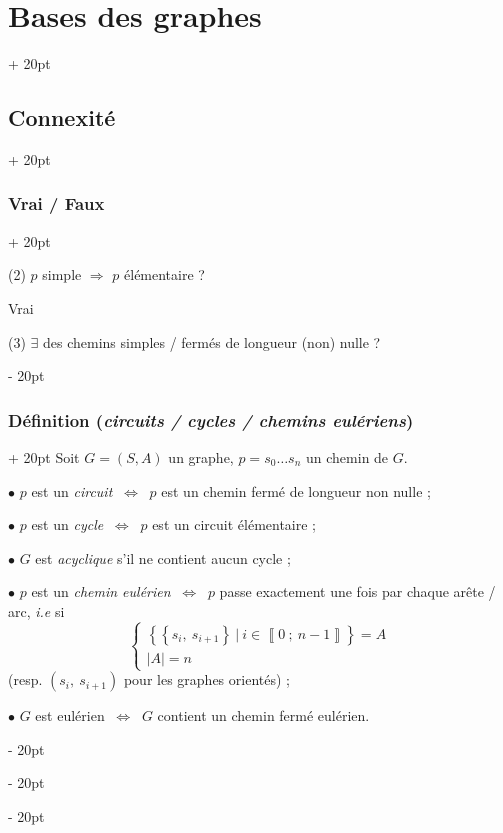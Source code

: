 \documentclass[a4paper, 12pt, twoside]{article}
\newcommand{\nset}[2]{\left\llbracket #1\ ;\ #2 \right\rrbracket}
\newcommand{\set}[1]{\left\{ #1 \right\}}
\newcommand{\abs}[1]{\left\lvert #1 \right\rvert}
\newcommand{\ssi}{\ \Leftrightarrow \ }
\newcommand{\eqsys}[2]{\begin{cases} #1 \\ #2 \end{cases}}
\newcommand{\ind}[1][20pt]{\advance\leftskip + #1}
\newcommand{\deind}[1][20pt]{\advance\leftskip - #1}
\newenvironment{indt}[2][20pt]{#2 \par \ind[#1]}{\par \deind} %
\begin{document}
\begin{indt}{\section{Bases des graphes}}
\begin{indt}{\subsection{Connexité}}
\begin{indt}{\subsubsection{Vrai / Faux}}
                \begin{center}
                \end{center}

                \vspace{12pt}
                
                (2) $p$ simple $\Rightarrow$ $p$ élémentaire ?

                Vrai

                (3) $\exists$ des chemins simples / fermés de longueur (non) nulle ?
            \end{indt}

            \vspace{12pt}
            
            \begin{indt}{\subsubsection{Définition (\textit{circuits / cycles / chemins eulériens})}}
                Soit $G = (S, A)$ un graphe, $p = s_0 \ldots s_n$ un chemin de $G$.

                $\bullet$ $p$ est un \textit{circuit} $\ssi$ $p$ est un chemin fermé de longueur non nulle ;

                $\bullet$ $p$ est un \textit{cycle} $\ssi$ $p$ est un circuit élémentaire ;

                $\bullet$ $G$ est \textit{acyclique} s'il ne contient aucun cycle ;

                $\bullet$ $p$ est un \textit{chemin eulérien} $\ssi$ $p$ passe exactement une fois par chaque arête / arc, \textit{i.e} si
                \[
                    \eqsys{\set{ \set{s_i,\ s_{i + 1}}\ |\ i \in \nset{0}{n - 1} } = A}{\abs A = n}
                \]
                (resp. $(s_i,\ s_{i + 1})$ pour les graphes orientés) ;

                $\bullet$ $G$ est eulérien $\ssi$ $G$ contient un chemin fermé eulérien.
            \end{indt}


\end{indt}
\end{indt}
\end{document}
